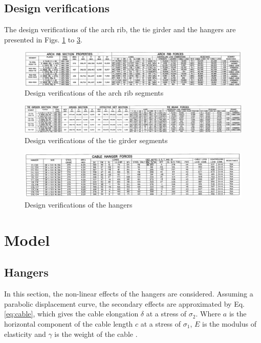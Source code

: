 \subsection{Design verifications} \label{app:design_verifications}
The design verifications of the arch rib, the tie girder and the hangers are presented in Figs. \ref{fig:arch_design_verification} to \ref{fig:hanger_design_verification}.
\begin{figure}[H]
    \centering
    \includegraphics[width=\textwidth]{overleaf/Appendix/Design drawings/arch rib verifications.PNG}
    \caption{Design verifications of the arch rib segments}
    \label{fig:arch_design_verification}
\end{figure}
\begin{figure}[H]
    \centering
    \includegraphics[width=\textwidth]{overleaf/Appendix/Design drawings/tie girder verifications.PNG}
    \caption{Design verifications of the tie girder segments}
    \label{fig:tie_design_verification}
\end{figure}
\begin{figure}[H]
    \centering
    \includegraphics[width=\textwidth]{overleaf/Appendix/Design drawings/cable verifications.PNG}
    \caption{Design verifications of the hangers}
    \label{fig:hanger_design_verification}
\end{figure}



\newpage
\section{Model}
\label{AppendixModel}
\subsection{Hangers}
\label{Appendix_A_Hangers}
In this section, the non-linear effects of the hangers are considered. Assuming a parabolic displacement curve, the secondary effects are approximated by Eq. \eqref{eq:cable}, which gives the cable elongation $\delta$ at a stress of $\sigma_2$. Where $a$ is the horizontal component of the cable length $c$ at a stress of $\sigma_1$, $E$ is the modulus of elasticity and $\gamma$ is the weight of the cable \cite{NIELS}. 

